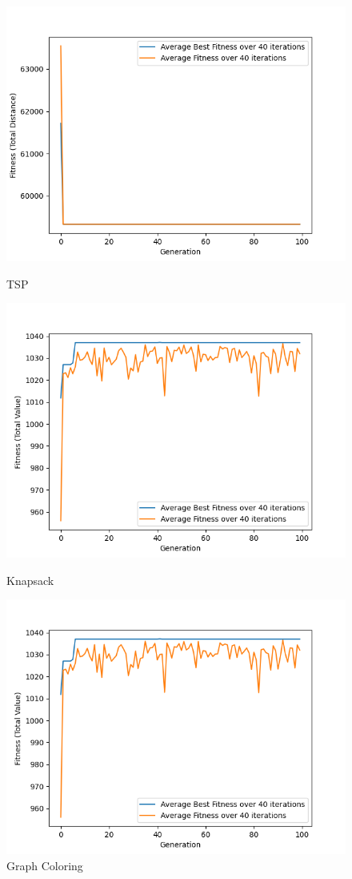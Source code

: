\documentclass[11pt, letterpaper]{article}
\begin{document}
\begin{figure}[H]
  \includegraphics[width=\linewidth]{images/tsp_tr_tr.png}
  \caption{TSP}
\endminipage\hfill
{}
  \includegraphics[width=\linewidth]{images/knapsack_tr_tr.png}
  \caption{Knapsack}
\endminipage\hfill
{}%
  \includegraphics[width=\linewidth]{images/knapsack_tr_tr.png}
  \caption{Graph Coloring}
\endminipage
\end{figure}
\end{document}
